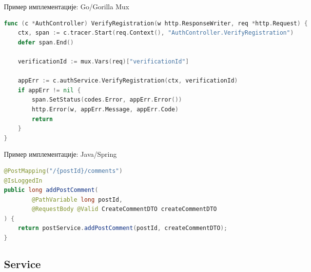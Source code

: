 \documentclass{beamer}
\begin{document}
    \begin{frame}[fragile]{Пример имплементације: Go/Gorilla Mux}
        \begin{adjustbox}{width=\textwidth,height=\textheight,keepaspectratio}
            \begin{lstlisting}[language=go]
func (c *AuthController) VerifyRegistration(w http.ResponseWriter, req *http.Request) {
    ctx, span := c.tracer.Start(req.Context(), "AuthController.VerifyRegistration")
    defer span.End()

    verificationId := mux.Vars(req)["verificationId"]

    appErr := c.authService.VerifyRegistration(ctx, verificationId)
    if appErr != nil {
        span.SetStatus(codes.Error, appErr.Error())
        http.Error(w, appErr.Message, appErr.Code)
        return
    }
}
            \end{lstlisting}
        \end{adjustbox}
    \end{frame}
    
    \begin{frame}[fragile]{Пример имплементације: Java/Spring}
        \begin{adjustbox}{width=\textwidth,height=\textheight,keepaspectratio}
            \begin{lstlisting}[language=java]
@PostMapping("/{postId}/comments")
@IsLoggedIn
public long addPostComment(
        @PathVariable long postId,
        @RequestBody @Valid CreateCommentDTO createCommentDTO
) {
    return postService.addPostComment(postId, createCommentDTO);
}

            \end{lstlisting}
        \end{adjustbox}
    \end{frame}
    
    \subsection{Service}
    
\end{document}
